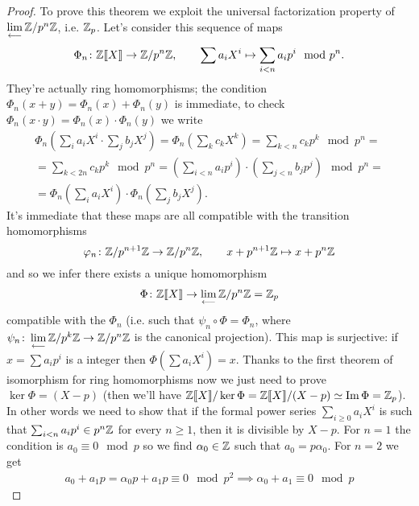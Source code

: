 		\begin{proof}
			To prove this theorem we exploit the universal factorization property of $\lim\limits_{\longleftarrow}\mathbb{Z}/p^n\mathbb{Z}$, i.e. $\mathbb{Z}_p$.  Let's consider this sequence of maps
			\begin{gather*}
				\Phi_n\colon \mathbb{Z}\llbracket X \rrbracket \to \mathbb{Z}/p^n\mathbb{Z} \text{,} \qquad \sum a_iX^i \mapsto \sum_{i < n}a_ip^i \mod p^n.
			\end{gather*}
			They're actually ring homomorphisms; the condition $\Phi_n(x + y) = \Phi_n(x) + \Phi_n(y)$ is immediate, to check $\Phi_n(x\cdot y) = \Phi_n(x)\cdot \Phi_n(y)$ we write
			\begin{gather*}
				\Phi_n\left( \sum_ia_iX^i \cdot \sum_jb_jX^j \right) = \Phi_n\left(\sum_k c_kX^k\right) = \sum_{k < n} c_kp^k \mod p^n = \\ = \sum_{k < 2n} c_kp^k \mod p^n = \left(\sum_{i < n}a_ip^i\right) \cdot \left(\sum_{j < n}b_jp^j\right) \mod p^n =\\
				= 	\Phi_n\left(\sum_ia_iX^i \right) \cdot \Phi_n\left(\sum_jb_jX^j \right).
			\end{gather*}
			It's immediate that these maps are all compatible with the transition homomorphisms 
			\[
				\varphi_n\colon \mathbb{Z}/p^{n+1}\mathbb{Z} \to \mathbb{Z}/p^n\mathbb{Z}, \qquad x + p^{n+1}\mathbb{Z} \mapsto x + p^n\mathbb{Z}
			\]
			and so we infer there exists a unique homomorphism
			\begin{gather*}
				\Phi\colon \mathbb{Z}\llbracket X \rrbracket \to \lim\limits_{\longleftarrow}\mathbb{Z}/p^n\mathbb{Z} = \mathbb{Z}_p
			\end{gather*}
			compatible with the $\Phi_n$ (i.e. such that $\psi_n \circ \Phi = \Phi_n$, where $\psi_n\colon \lim\limits_{\longleftarrow}\mathbb{Z}/p^k\mathbb{Z} \to \mathbb{Z}/p^n\mathbb{Z}$ is the canonical projection). This map is surjective: if $x = \sum a_ip^i$ is a \padic integer then $\Phi\left(\sum a_iX^i \right) = x$. Thanks to the first theorem of isomorphism for ring homomorphisms now we just need to prove $\ker \Phi = (X - p)$ (then we'll have $\mathbb{Z}\llbracket X \rrbracket/\ker \Phi = \mathbb{Z}\llbracket X \rrbracket/(X - p) \simeq \operatorname{Im} \Phi = \mathbb{Z}_p$).
			In other words we need to show that if the formal power series $\sum_{i \geq 0} a_iX^i$ is such that $\sum_{i < n} a_ip^i \in p^n\mathbb{Z}$ for every $n \geq 1$, then it is divisible by $X - p$. For $n = 1$ the condition is $a_0 \equiv 0 \mod p$ so we find $\alpha_0 \in \mathbb{Z}$ such that $a_0 = p\alpha_0$. For $n = 2$ we get
			\begin{gather*}
				a_0 + a_1p  = \alpha_0p + a_1p \equiv 0 \mod p^2 \implies \alpha_0 + a_1 \equiv 0 \mod p
			\end{gather*}

\end{proof}
